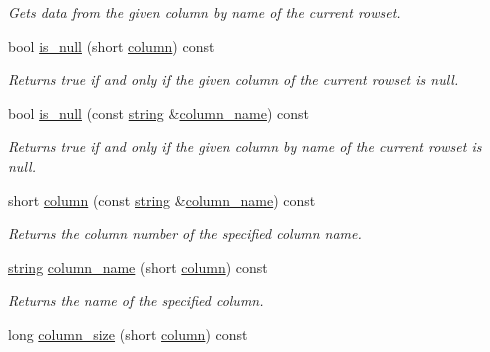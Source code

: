 \begin{DoxyCompactItemize}
\begin{DoxyCompactList}\small\item\em Gets data from the given column by name of the current rowset. \end{DoxyCompactList}\item 
bool \mbox{\hyperlink{classnanodbc_1_1result_a85462f6eaed91a5b03739319bd2712e7}{is\+\_\+null}} (short \mbox{\hyperlink{classnanodbc_1_1result_ae4e254b2db63c65473cc058de3d5a844}{column}}) const
\begin{DoxyCompactList}\small\item\em Returns true if and only if the given column of the current rowset is null. \end{DoxyCompactList}\item 
bool \mbox{\hyperlink{classnanodbc_1_1result_a9201ef6814bf934ffb9caa7b62f3bad9}{is\+\_\+null}} (const \mbox{\hyperlink{namespacenanodbc_abfc0ece56278e590911ec8352774c212}{string}} \&\mbox{\hyperlink{classnanodbc_1_1result_a2bd3fc4e416108960c4191b2cbba256b}{column\+\_\+name}}) const
\begin{DoxyCompactList}\small\item\em Returns true if and only if the given column by name of the current rowset is null. \end{DoxyCompactList}\item 
short \mbox{\hyperlink{classnanodbc_1_1result_ae4e254b2db63c65473cc058de3d5a844}{column}} (const \mbox{\hyperlink{namespacenanodbc_abfc0ece56278e590911ec8352774c212}{string}} \&\mbox{\hyperlink{classnanodbc_1_1result_a2bd3fc4e416108960c4191b2cbba256b}{column\+\_\+name}}) const
\begin{DoxyCompactList}\small\item\em Returns the column number of the specified column name. \end{DoxyCompactList}\item 
\mbox{\hyperlink{namespacenanodbc_abfc0ece56278e590911ec8352774c212}{string}} \mbox{\hyperlink{classnanodbc_1_1result_a2bd3fc4e416108960c4191b2cbba256b}{column\+\_\+name}} (short \mbox{\hyperlink{classnanodbc_1_1result_ae4e254b2db63c65473cc058de3d5a844}{column}}) const
\begin{DoxyCompactList}\small\item\em Returns the name of the specified column. \end{DoxyCompactList}\item 
long \mbox{\hyperlink{classnanodbc_1_1result_ae6c9d812e8be9ea46a5cd346e83a6cba}{column\+\_\+size}} (short \mbox{\hyperlink{classnanodbc_1_1result_ae4e254b2db63c65473cc058de3d5a844}{column}}) const

\end{DoxyCompactItemize}
